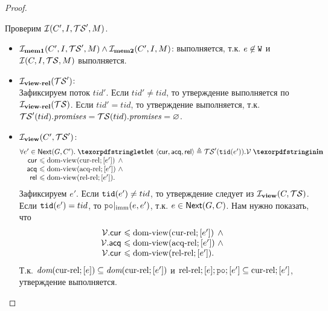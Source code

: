 \begin{proof}
\begin{itemize}
      Проверим $\mathcal{I}(C', I, \mathcal{TS}', M)$.
      \begin{itemize}
        \item $\mathcal{I}_{\rm \bf mem1}(C', I, \mathcal{TS}', M) \land \mathcal{I}_{\rm \bf mem2}(C', I, M)$:
          выполняется, т.к. $e \not\in {\mathtt{W}}$ и $\mathcal{I}(C, I, \mathcal{TS}, M)$ выполняется.
        \item $\mathcal{I}_{\rm \bf view\text{-}rel}(\mathcal{TS}')$: \\
          Зафиксируем поток $tid'$. Если $tid' \neq tid$, то утверждение выполняется по $\mathcal{I}_{\rm \bf view\text{-}rel}(\mathcal{TS})$.
          Если $tid' = tid$, то утверждение выполняется, т.к. $\mathcal{TS}'(tid).\mathit{promises} = \mathcal{TS}(tid).\mathit{promises} = \varnothing$.
        \item $\mathcal{I}_{\rm \bf view}(C', \mathcal{TS}')$:
          \[\inarr{
  \forall e' \in \nextset(G, C'). \; \letdef{\tup{\viewCur, \viewAcq, \viewfRel}}{\TSf'(\lTID(e')).\View}\\
  \quad
  \begin{array}{@{}r@{~}l@{~}l}
    \viewCur  & \le \domView(\curRel; [e']) & \land {} \\
    \viewAcq  & \le \domView(\acqRel; [e']) & \land {} \\
    \viewfRel & \le \domView(\relRel; [e']). \\
  \end{array}
          }\]
          Зафиксируем $e'$. Если ${\mathtt{tid}}(e') \neq tid$, то утверждение следует из $\mathcal{I}_{\rm \bf view}(C, \mathcal{TS})$.
          Если ${\mathtt{tid}}(e') = tid$, то $\imm{\lPO}(e, e')$, т.к. $e \in {\sf Next}(G, C)$.
          Нам нужно показать, что
          \[\inarr{
  \begin{array}{@{}r@{~}l@{~}l}
    \View.\viewCur & \le \domView(\curRel; [e']) & \land {} \\
    \View.\viewAcq & \le \domView(\acqRel; [e']) & \land {} \\
    \View.\viewCur & \le \domView(\relRel; [e']). \\
  \end{array}
          }\]
          Т.к. $\textit{dom}{({{\rm cur\text{-}rel}; [e]})} \subseteq \textit{dom}{({{\rm cur\text{-}rel}; [e']})}$
          и $\relRel;[e];\lPO;[e'] \suq \curRel; [e']$, утверждение выполняется.
          

\end{itemize}
\end{itemize}
\end{proof}
